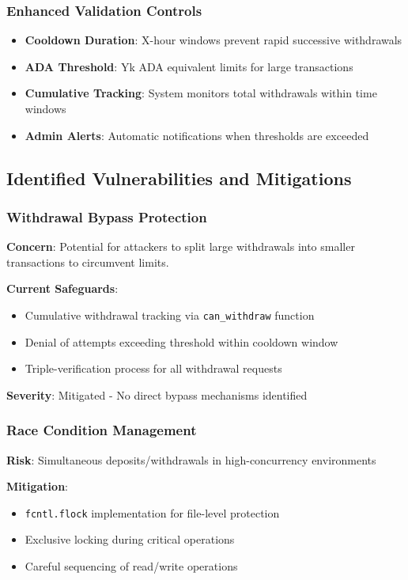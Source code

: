 \documentclass[11pt,a4paper]{article}
\begin{document}
\subsubsection{Enhanced Validation Controls}
\begin{itemize}
    \item \textbf{Cooldown Duration}: X-hour windows prevent rapid successive withdrawals
    \item \textbf{ADA Threshold}: Yk ADA equivalent limits for large transactions
    \item \textbf{Cumulative Tracking}: System monitors total withdrawals within time windows
    \item \textbf{Admin Alerts}: Automatic notifications when thresholds are exceeded
\end{itemize}

\subsection{Identified Vulnerabilities and Mitigations}

\subsubsection{Withdrawal Bypass Protection}
\textbf{Concern}: Potential for attackers to split large withdrawals into smaller transactions to circumvent limits.

\textbf{Current Safeguards}:
\begin{itemize}
    \item Cumulative withdrawal tracking via \texttt{can\_withdraw} function
    \item Denial of attempts exceeding threshold within cooldown window
    \item Triple-verification process for all withdrawal requests
\end{itemize}

\textbf{Severity}: \textcolor{danzoGreen}{Mitigated} - No direct bypass mechanisms identified

\subsubsection{Race Condition Management}
\textbf{Risk}: Simultaneous deposits/withdrawals in high-concurrency environments

\textbf{Mitigation}:
\begin{itemize}
    \item \texttt{fcntl.flock} implementation for file-level protection
    \item Exclusive locking during critical operations
    \item Careful sequencing of read/write operations
\end{itemize}
\end{document}
